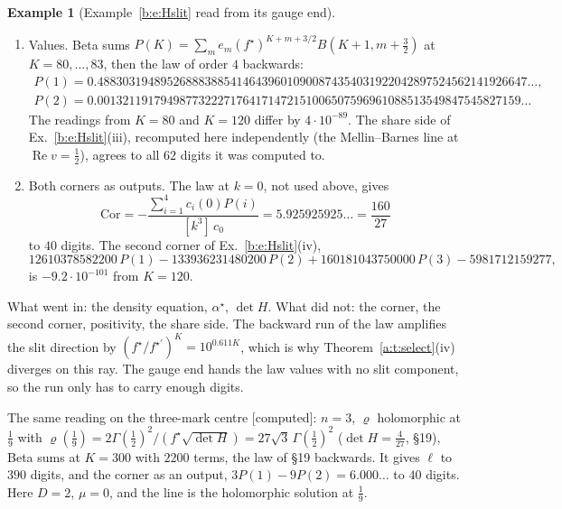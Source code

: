 \documentclass[11pt]{article}
\theoremstyle{plain}
\theoremstyle{definition}
\newtheorem{example}[proposition]{Example}
\theoremstyle{remark}
\newcommand{\computed}{\textup{[computed]}}
\begin{document}
\begin{example}[Example~\ref{b:e:Hslit} read from its gauge end]
\begin{enumerate}[label=(\roman*)]
\item Values. Beta sums $P(K)=\sum_me_m(f^\star)^{K+m+3/2}B(K+1,m+\frac32)$ at $K=80,\dots,83$, then the law of order $4$ backwards:
\begin{gather*}
P(1)=0.48830319489526888388541464396010900874354031922042897524562141926647\ldots,\\
P(2)=0.0013211917949877322271764171472151006507596961088513549847545827159\ldots
\end{gather*}
The readings from $K=80$ and $K=120$ differ by $4\cdot10^{-89}$. The share side of Ex.~\ref{b:e:Hslit}(iii), recomputed here independently (the Mellin--Barnes line at $\operatorname{Re}v=\frac12$), agrees to all $62$ digits it was computed to.
\item Both corners as outputs. The law at $k=0$, not used above, gives
\[
\mathrm{Cor}=-\frac{\sum_{i=1}^4c_i(0)P(i)}{[k^3]\,c_0}=5.925925925\ldots=\frac{160}{27}
\]
to $40$ digits. The second corner of Ex.~\ref{b:e:Hslit}(iv),
\[
12610378582200\,P(1)-133936231480200\,P(2)+160181043750000\,P(3)-5981712159277,
\]
is $-9.2\cdot10^{-101}$ from $K=120$.
\end{enumerate}
What went in: the density equation, $\alpha^\star$, $\det H$. What did not: the corner, the second corner, positivity, the share side. The backward run of the law amplifies the slit direction by $(f^\star/f^{\star\prime})^K=10^{0.611K}$, which is why Theorem~\ref{a:t:select}(iv) diverges on this ray. The gauge end hands the law values with no slit component, so the run only has to carry enough digits.
\end{example}

\noindent The same reading on the three-mark centre \computed: $n=3$, $\varrho$ holomorphic at $\frac19$ with $\varrho(\frac19)=2\Gamma(\frac12)^2/(f^\star\sqrt{\det H})=27\sqrt3\,\Gamma(\frac12)^2$ ($\det H=\frac4{27}$, \S19), Beta sums at $K=300$ with $2200$ terms, the law of \S19 backwards. It gives $\ell$ to $390$ digits, and the corner as an output, $3P(1)-9P(2)=6.000\ldots$ to $40$ digits. Here $D=2$, $\mu=0$, and the line is the holomorphic solution at $\frac19$.
\end{document}
